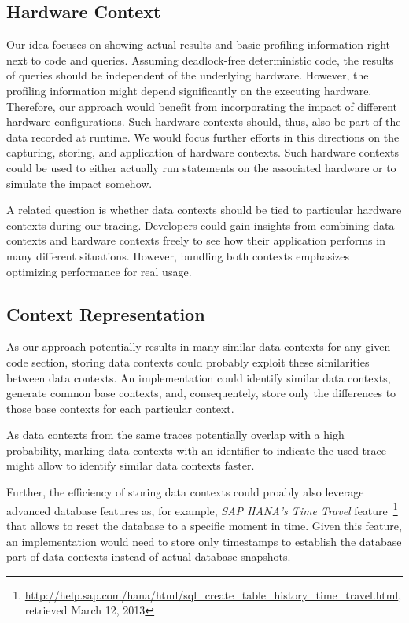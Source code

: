 \subsection{Hardware Context}
Our idea focuses on showing actual results and basic profiling information right next to code and queries.
Assuming deadlock-free deterministic code, the results of queries should be independent of the underlying hardware.
However, the profiling information might depend significantly on the executing hardware.
Therefore, our approach would benefit from incorporating the impact of different hardware configurations.
Such hardware contexts should, thus, also be part of the data recorded at runtime.
We would focus further efforts in this directions on the capturing, storing, and application of hardware contexts.
Such hardware contexts could be used to either actually run statements on the associated hardware or to simulate the impact somehow.

A related question is whether data contexts should be tied to particular hardware contexts during our tracing.
Developers could gain insights from combining data contexts and hardware contexts freely to see how their application performs in many different situations.
However, bundling both contexts emphasizes optimizing performance for real usage.

\subsection{Context Representation}
As our approach potentially results in many similar data contexts for any given code section, storing data contexts could probably exploit these similarities between data contexts.
An implementation could identify similar data contexts, generate common base contexts, and, consequentely, store only the differences to those base contexts for each particular context.

As data contexts from the same traces potentially overlap with a high probability, marking data contexts with an identifier to indicate the used trace might allow to identify similar data contexts faster.

Further, the efficiency of storing data contexts could proably also leverage advanced database features as, for example, \emph{SAP HANA's Time Travel} feature~\footnote{\url{http://help.sap.com/hana/html/sql_create_table_history_time_travel.html}, retrieved March 12, 2013} that allows to reset the database to a specific moment in time.
Given this feature, an implementation would need to store only timestamps to establish the database part of data contexts instead of actual database snapshots.
